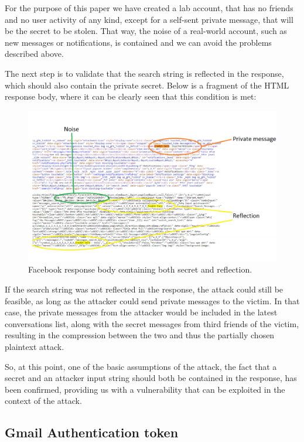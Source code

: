 For the purpose of this paper we have created a lab account, that has no friends
and no user activity of any kind, except for a self-sent private message, that
will be the secret to be stolen. That way, the noise of a real-world account,
such as new messages or notifications, is contained and we can avoid the
problems described above.

The next step is to validate that the search string is reflected in the
response, which should also contain the private secret. Below is a fragment of
the HTML response body, where it can be clearly seen that this condition is met:

\begin{figure}[H] \caption{Facebook response body containing both secret and
reflection.} \centering
\includegraphics[width=1.1\textwidth]{diagrams/fb_response.png}\end{figure}

If the search string was not reflected in the response, the attack could still
be feasible, as long as the attacker could send private messages to the victim.
In that case, the private messages from the attacker would be included in the
latest conversations list, along with the secret messages from third friends of
the victim, resulting in the compression between the two and thus the partially
chosen plaintext attack.

So, at this point, one of the basic assumptions of the attack, the fact that a
secret and an attacker input string should both be contained in the response,
has been confirmed, providing us with a vulnerability that can be exploited in
the context of the attack.

\subsection{Gmail Authentication token}

